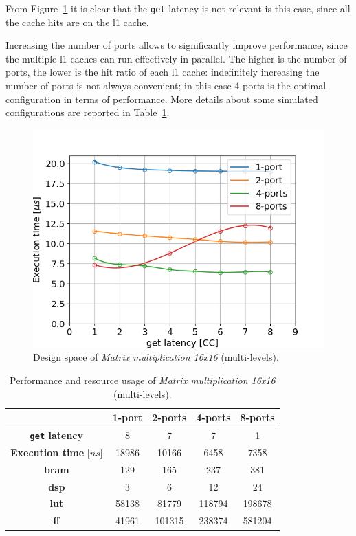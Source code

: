 \documentclass[11pt,a4paper,oneside]{memoir}
\begin{document}
From Figure~\ref{fig:matmul_16_l1_space} it is clear that the \texttt{get}
latency is not relevant is this case, since all the cache hits are on the
\ac{l1} cache.

Increasing the number of ports allows to significantly improve performance,
since the multiple \ac{l1} caches can run effectively in parallel.
The higher is the number of ports, the lower is the hit ratio of each \ac{l1}
cache: indefinitely increasing the number of ports is not always convenient;
in this case 4 ports is the optimal configuration in terms of performance.
More details about some simulated configurations are reported in
Table~\ref{tab:matmul_16_l1_ports_report}.

\begin{figure}[H]
	\centering
	\includegraphics[width=.8\textwidth]{matmul_16_multiport_L1_latency}
	\caption{Design space of \emph{Matrix multiplication 16x16}
	(multi-levels).}
	\label{fig:matmul_16_l1_space}
\end{figure}

\begin{table}[H]
	\begin{center}
		\begin{tabular}{ccccc}
			\hline
			\rowcolor{gray!50}
			& \textbf{1-port} & \textbf{2-ports} & \textbf{4-ports}
			& \textbf{8-ports} \\
			\hline
			\textbf{\texttt{get} latency} & 8 & 7 & 7 & 1 \\
			\rowcolor{gray!25}
			\textbf{Execution time} [$ns$] & 18986 & 10166 & 6458 &
			7358 \\
			\textbf{\ac{bram}} & 129 & 165 & 237 & 381 \\
			\rowcolor{gray!25}
			\textbf{\acs{dsp}} & 3 & 6 & 12 & 24 \\
			\textbf{\acs{lut}} & 58138 & 81779 & 118794 & 198678 \\
			\rowcolor{gray!25}
			\textbf{\acs{ff}} & 41961 & 101315 & 238374 & 581204 \\
			\hline
		\end{tabular}
	\end{center}
	\caption{Performance and resource usage of \emph{Matrix multiplication
	16x16} (multi-levels).}
	\label{tab:matmul_16_l1_ports_report}
\end{table}
\end{document}
